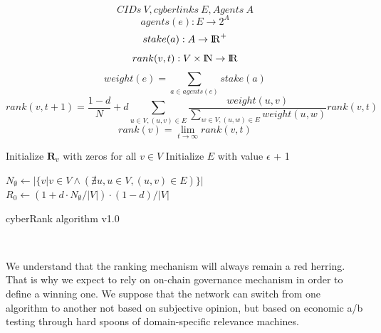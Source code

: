 \documentclass[8pt,oneside]{amsart}
\begin{document}
$$ CIDs \ V, cyberlinks \ E, Agents \ A $$
$$agents(e): E \rightarrow 2^{A}$$
$$stake(a): A \rightarrow {\rm I\!R}^+ $$
$$rank(v, t): V \times {\rm I\!N} \rightarrow {\rm I\!R} $$
$$weight(e) = \sum\limits_{a \in agents(e)}{stake(a)}$$
$$rank(v, t + 1) = \frac{1 - d}{N} + d\sum\limits_{u \in V, (u, v) \in E}{\frac{weight(u, v)}{\sum_{w \in V, (u, w) \in E}{weight(u, w)}}rank(v, t)} $$
$$rank(v) = \lim\limits_{t \rightarrow \infty} rank(v, t)$$
\begin{algorithm}


\BlankLine
Initialize $\textbf{R}_{v}$ with zeros for all $v \in V$\;
Initialize $E$ with value $\epsilon$ + 1\;

\BlankLine
$N_{\emptyset} \leftarrow |\{v|v \in V \land (\nexists u, u \in V, (u, v) \in E )\}|$ \;
$R_{0} \leftarrow (1 + d \cdot N_{\emptyset} / |V|) \cdot (1 - d) / |V| $ \;

\BlankLine
{}

\caption{cyberRank algorithm v1.0}\label{algo_disjdecomp}
\end{algorithm}\



We understand that the ranking mechanism will always remain a red herring. That is why we expect to rely on on-chain governance mechanism in order to define a winning one. We suppose that the network can switch from one algorithm to another not based on subjective opinion, but based on economic a/b testing through hard spoons of domain-specific relevance machines.
\end{document}

